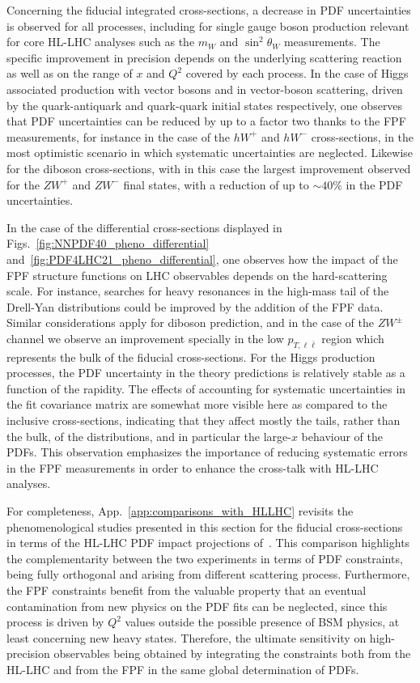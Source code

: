 Concerning the fiducial integrated cross-sections, a decrease in PDF
uncertainties is observed for all processes,
including for single gauge boson production relevant for core
HL-LHC analyses such as the $m_W$ and $\sin^2\theta_W$ measurements.
%
The specific improvement in precision depends
on the underlying scattering reaction as well as on the range
of $x$ and $Q^2$ covered by each process.
%
In the case of  Higgs associated production with vector bosons and in vector-boson
scattering,
driven by the quark-antiquark and quark-quark initial states respectively,
one observes that PDF uncertainties can  be reduced
by up to a factor two thanks to the FPF measurements, for instance
in the case of the $hW^+$ and $hW^-$ cross-sections,
in the most optimistic scenario in which systematic uncertainties
are neglected.
%
Likewise for the diboson cross-sections, with in this case the largest
improvement observed for the $ZW^+$  and  $ZW^-$ final states, with a reduction
of up to $\sim 40\%$ in the PDF uncertainties.

In the case of the differential cross-sections displayed in Figs.~\ref{fig:NNPDF40_pheno_differential}
and~\ref{fig:PDF4LHC21_pheno_differential},
one observes
how the impact of the FPF structure functions on LHC observables depends
on the hard-scattering scale.
%
For instance, searches for heavy resonances in the high-mass tail of the Drell-Yan
distributions could be improved by the addition of the FPF data.
%
Similar considerations apply for diboson prediction, and in the case of the $ZW^{\pm}$ channel we observe
an improvement specially in the low $p_{T,\ell\bar{\ell}}$ region which
represents the bulk of the fiducial cross-sections.
%
For the Higgs production processes, the PDF uncertainty in the theory predictions is relatively
stable as a function of the rapidity.
%
The effects of accounting for systematic uncertainties in the fit covariance
matrix are somewhat more visible here as compared to the inclusive cross-sections,
indicating that they affect mostly
the tails, rather than the bulk, of the distributions, and in particular the large-$x$
behaviour of the PDFs.
%
This observation emphasizes the importance of reducing systematic errors
in the FPF measurements in order to enhance the cross-talk with HL-LHC analyses.

For completeness, App.~\ref{app:comparisons_with_HLLHC} revisits
the phenomenological studies  presented in this section for the fiducial cross-sections
in terms of the  HL-LHC PDF impact projections of~\cite{AbdulKhalek:2018rok}.
%
This comparison highlights the complementarity between the two experiments
in terms of PDF constraints, being fully orthogonal and arising from different
scattering process.
%
Furthermore, the FPF constraints benefit from the valuable property
that an eventual contamination from new physics on the PDF fits 
can be neglected, since this process is driven by $Q^2$ values outside 
the possible presence of BSM physics, at least concerning new heavy states.
%
Therefore, the ultimate sensitivity on high-precision observables being
obtained by integrating the constraints both from the HL-LHC and from the FPF
in the same global determination of PDFs.
